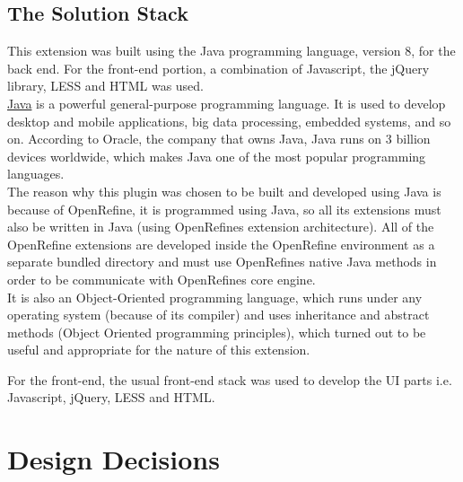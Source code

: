 \subsection{The Solution Stack}
This extension was built using the Java programming language, version 8, for the back end. For the front-end portion,
a combination of Javascript, the jQuery library, LESS and HTML was used. \\
\newline
\href{https://www.java.com/en/}{Java} is a powerful general-purpose programming language.
It is used to develop desktop and mobile applications,
big data processing, embedded systems, and so on.
According to Oracle, the company that owns Java, Java runs on 3 billion devices worldwide, which makes Java one of the
most popular programming languages.~\cite{WhatIsJava}\\
\newline
The reason why this plugin was chosen to be built and developed using Java is
because of OpenRefine, it is programmed using Java,
so all its extensions must also be written in Java (using OpenRefine\textquotesingle s extension
architecture). All of the OpenRefine extensions are developed inside the
OpenRefine environment as a separate bundled directory and must use OpenRefine\textquotesingle s
native Java methods in order to be communicate with OpenRefine\textquotesingle s core engine.\\
It is also an Object-Oriented programming language, which runs under any operating system
(because of its compiler) and uses inheritance and abstract methods (Object Oriented programming principles),
which turned out to be useful and appropriate for the nature of this extension.\\
\newline

For the front-end, the usual front-end stack was used to develop the UI parts i.e. Javascript, jQuery, LESS and HTML.
\pagebreak
\section{Design Decisions}
